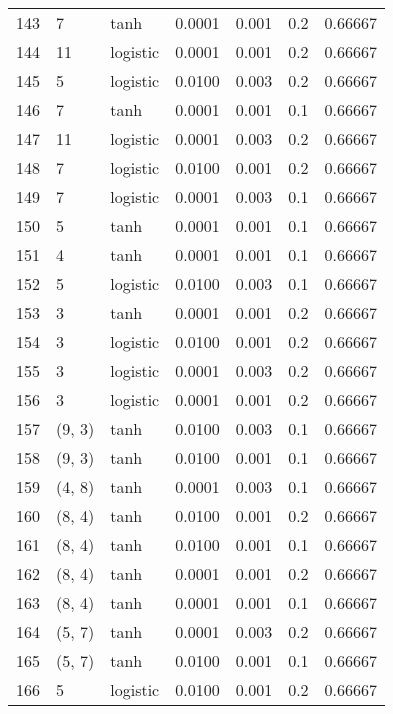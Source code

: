 \begin{tabular}{lllrrrr}
143 &           7 &      tanh &  0.0001 &  0.001 &  0.2 &   0.66667 \\
144 &          11 &  logistic &  0.0001 &  0.001 &  0.2 &   0.66667 \\
145 &           5 &  logistic &  0.0100 &  0.003 &  0.2 &   0.66667 \\
146 &           7 &      tanh &  0.0001 &  0.001 &  0.1 &   0.66667 \\
147 &          11 &  logistic &  0.0001 &  0.003 &  0.2 &   0.66667 \\
148 &           7 &  logistic &  0.0100 &  0.001 &  0.2 &   0.66667 \\
149 &           7 &  logistic &  0.0001 &  0.003 &  0.1 &   0.66667 \\
150 &           5 &      tanh &  0.0001 &  0.001 &  0.1 &   0.66667 \\
151 &           4 &      tanh &  0.0001 &  0.001 &  0.1 &   0.66667 \\
152 &           5 &  logistic &  0.0100 &  0.003 &  0.1 &   0.66667 \\
153 &           3 &      tanh &  0.0001 &  0.001 &  0.2 &   0.66667 \\
154 &           3 &  logistic &  0.0100 &  0.001 &  0.2 &   0.66667 \\
155 &           3 &  logistic &  0.0001 &  0.003 &  0.2 &   0.66667 \\
156 &           3 &  logistic &  0.0001 &  0.001 &  0.2 &   0.66667 \\
157 &      (9, 3) &      tanh &  0.0100 &  0.003 &  0.1 &   0.66667 \\
158 &      (9, 3) &      tanh &  0.0100 &  0.001 &  0.1 &   0.66667 \\
159 &      (4, 8) &      tanh &  0.0001 &  0.003 &  0.1 &   0.66667 \\
160 &      (8, 4) &      tanh &  0.0100 &  0.001 &  0.2 &   0.66667 \\
161 &      (8, 4) &      tanh &  0.0100 &  0.001 &  0.1 &   0.66667 \\
162 &      (8, 4) &      tanh &  0.0001 &  0.001 &  0.2 &   0.66667 \\
163 &      (8, 4) &      tanh &  0.0001 &  0.001 &  0.1 &   0.66667 \\
164 &      (5, 7) &      tanh &  0.0001 &  0.003 &  0.2 &   0.66667 \\
165 &      (5, 7) &      tanh &  0.0100 &  0.001 &  0.1 &   0.66667 \\
166 &           5 &  logistic &  0.0100 &  0.001 &  0.2 &   0.66667 \\

\end{tabular}
